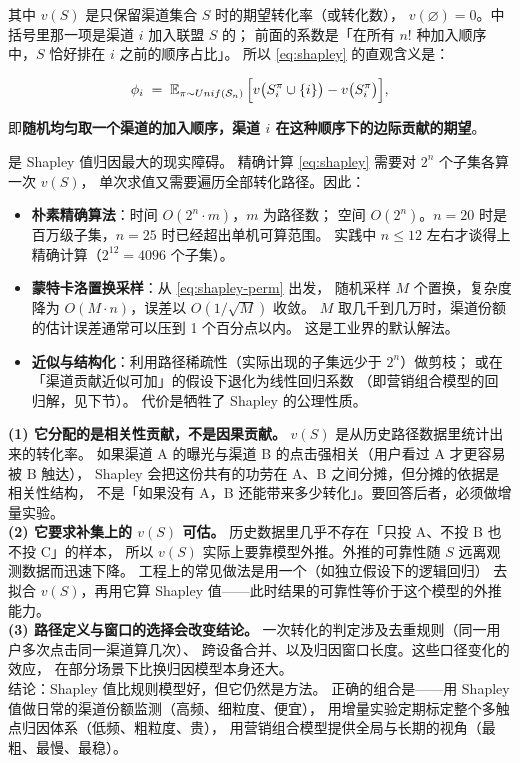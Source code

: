 其中 $v(S)$ 是只保留渠道集合 $S$ 时的期望转化率（或转化数），
$v(\varnothing) = 0$。中括号里那一项是渠道 $i$ 加入联盟 $S$ 的；
前面的系数是「在所有 $n!$ 种加入顺序中，$S$ 恰好排在 $i$ 之前的顺序占比」。
所以 \eqref{eq:shapley} 的直观含义是：

\begin{equation}
\phi_i \;=\; \operatorname{\mathbb{E}}_{\pi \sim Unif(\mathcal{S}_n)}
\Big[ v\big(S_i^{\pi} \cup \{i\}\big) - v\big(S_i^{\pi}\big) \Big],
\label{eq:shapley-perm}
\end{equation}

即\textbf{随机均匀取一个渠道的加入顺序，渠道 $i$ 在这种顺序下的边际贡献的期望}。

 是 Shapley 值归因最大的现实障碍。
精确计算 \eqref{eq:shapley} 需要对 $2^{n}$ 个子集各算一次 $v(S)$，
单次求值又需要遍历全部转化路径。因此：

\begin{itemize}
  \item \textbf{朴素精确算法}：时间 $O(2^{n} \cdot m)$，$m$ 为路径数；
        空间 $O(2^{n})$。$n = 20$ 时是百万级子集，$n = 25$ 时已经超出单机可算范围。
        实践中 $n \le 12$ 左右才谈得上精确计算（$2^{12} = 4096$ 个子集）。
  \item \textbf{蒙特卡洛置换采样}：从 \eqref{eq:shapley-perm} 出发，
        随机采样 $M$ 个置换，复杂度降为 $O(M \cdot n)$，误差以 $O(1/\sqrt{M})$ 收敛。
        $M$ 取几千到几万时，渠道份额的估计误差通常可以压到 1 个百分点以内。
        这是工业界的默认解法。
  \item \textbf{近似与结构化}：利用路径稀疏性（实际出现的子集远少于 $2^{n}$）做剪枝；
        或在「渠道贡献近似可加」的假设下退化为线性回归系数
        （即营销组合模型的回归解，见下节）。
        代价是牺牲了 Shapley 的公理性质。
\end{itemize}

\begin{insight}
\textbf{(1) 它分配的是相关性贡献，不是因果贡献。}
$v(S)$ 是从历史路径数据里统计出来的转化率。
如果渠道 A 的曝光与渠道 B 的点击强相关（用户看过 A 才更容易被 B 触达），
Shapley 会把这份共有的功劳在 A、B 之间分摊，但分摊的依据是相关性结构，
不是「如果没有 A，B 还能带来多少转化」。要回答后者，必须做增量实验。\\
\textbf{(2) 它要求补集上的 $v(S)$ 可估。}
历史数据里几乎不存在「只投 A、不投 B 也不投 C」的样本，
所以 $v(S)$ 实际上要靠模型外推。外推的可靠性随 $S$ 远离观测数据而迅速下降。
工程上的常见做法是用一个（如独立假设下的逻辑回归）
去拟合 $v(S)$，再用它算 Shapley 值——此时结果的可靠性等价于这个模型的外推能力。\\
\textbf{(3) 路径定义与窗口的选择会改变结论。}
一次转化的判定涉及去重规则（同一用户多次点击同一渠道算几次）、
跨设备合并、以及归因窗口长度。这些口径变化的效应，
在部分场景下比换归因模型本身还大。\\
结论：Shapley 值比规则模型好，但它仍然是方法。
正确的组合是——用 Shapley 值做日常的渠道份额监测（高频、细粒度、便宜），
用增量实验定期标定整个多触点归因体系（低频、粗粒度、贵），
用营销组合模型提供全局与长期的视角（最粗、最慢、最稳）。
\end{insight}

